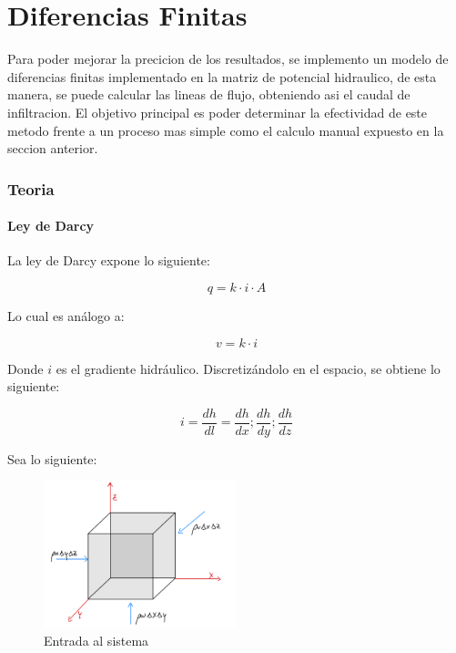 \part{Diferencias Finitas}

Para poder mejorar la precicion de los resultados, se implemento un modelo de diferencias finitas implementado en la matriz de potencial hidraulico, de esta manera, se puede calcular las lineas de flujo, obteniendo asi el caudal de infiltracion.
El objetivo principal es poder determinar la efectividad de este metodo frente a un proceso mas simple como el calculo manual expuesto en la seccion anterior.

\section{Teoria}

\subsection{Ley de Darcy}

La ley de Darcy expone lo siguiente:

\begin{equation}
    q = k \cdot i \cdot A
\end{equation}

Lo cual es análogo a:

\begin{equation}
    v = k \cdot i
\end{equation}

Donde \(i\) es el gradiente hidráulico. Discretizándolo en el espacio, se obtiene lo siguiente:

\begin{equation}
    i = \frac{dh}{dl} = \frac{dh}{dx}; \frac{dh}{dy}; \frac{dh}{dz}
\end{equation}

Sea lo siguiente:

\begin{figure}[H]
    \centering
    \includegraphics[width=0.5\textwidth]{FOTOS/in.jpg}
    \caption{Entrada al sistema}
    \label{fig:ley_darcy_in}
\end{figure}

